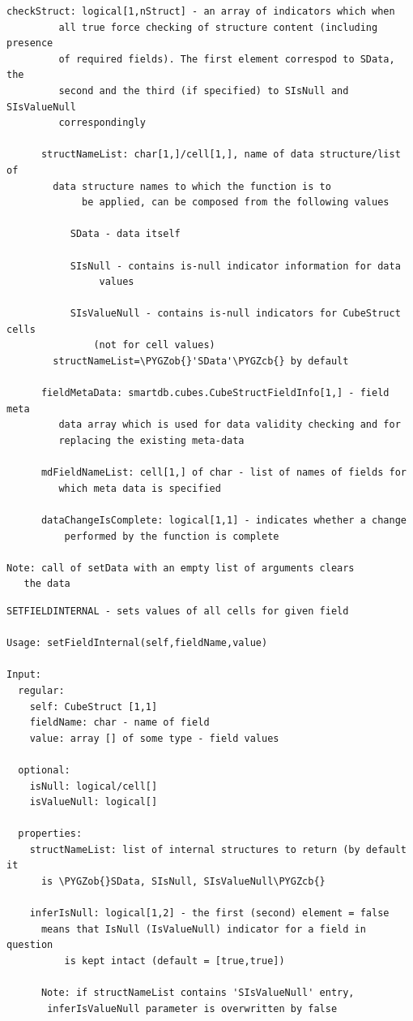 \documentclass[letterpaper,10pt,english]{sphinxmanual}
\def\PYGZob{\char`\{}
\def\PYGZcb{\char`\}}
\begin{document}
\begin{Verbatim}[commandchars=\\\{\}]
      checkStruct: logical[1,nStruct] - an array of indicators which when
         all true force checking of structure content (including presence
         of required fields). The first element correspod to SData, the
         second and the third (if specified) to SIsNull and SIsValueNull
         correspondingly

      structNameList: char[1,]/cell[1,], name of data structure/list of
        data structure names to which the function is to
             be applied, can be composed from the following values

           SData - data itself

           SIsNull - contains is-null indicator information for data
                values

           SIsValueNull - contains is-null indicators for CubeStruct cells
               (not for cell values)
        structNameList=\PYGZob{}'SData'\PYGZcb{} by default

      fieldMetaData: smartdb.cubes.CubeStructFieldInfo[1,] - field meta
         data array which is used for data validity checking and for
         replacing the existing meta-data

      mdFieldNameList: cell[1,] of char - list of names of fields for
         which meta data is specified

      dataChangeIsComplete: logical[1,1] - indicates whether a change
          performed by the function is complete

Note: call of setData with an empty list of arguments clears
   the data
\end{Verbatim}
\label{chap_func:smartdb-relations-atypifiedstaticrelation-setfieldinternal}
\begin{Verbatim}[commandchars=\\\{\}]
SETFIELDINTERNAL - sets values of all cells for given field

Usage: setFieldInternal(self,fieldName,value)

Input:
  regular:
    self: CubeStruct [1,1]
    fieldName: char - name of field
    value: array [] of some type - field values

  optional:
    isNull: logical/cell[]
    isValueNull: logical[]

  properties:
    structNameList: list of internal structures to return (by default it
      is \PYGZob{}SData, SIsNull, SIsValueNull\PYGZcb{}

    inferIsNull: logical[1,2] - the first (second) element = false
      means that IsNull (IsValueNull) indicator for a field in question
          is kept intact (default = [true,true])

      Note: if structNameList contains 'SIsValueNull' entry,
       inferIsValueNull parameter is overwritten by false
\end{Verbatim}
\end{document}
